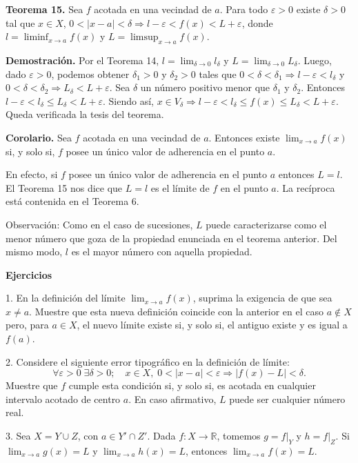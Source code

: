 \documentclass[12pt,oneside]{book}
\begin{document}
\textbf{Teorema 15.} Sea \(f\) acotada en una vecindad de \(a\). Para todo \(\varepsilon > 0\) existe \(\delta > 0\) tal que \(x \in X\), \(0 < |x - a| < \delta \Rightarrow l - \varepsilon < f(x) < L + \varepsilon\), donde \(l = \liminf_{x \to a} f(x)\) y \(L = \limsup_{x \to a} f(x)\).

\textbf{Demostración.} Por el Teorema 14, \(l = \lim_{\delta \to 0} l_\delta\) y \(L = \lim_{\delta \to 0} L_\delta\). Luego, dado \(\varepsilon > 0\), podemos obtener \(\delta_1 > 0\) y \(\delta_2 > 0\) tales que \(0 < \delta < \delta_1 \Rightarrow l - \varepsilon < l_\delta\) y \(0 < \delta < \delta_2 \Rightarrow L_\delta < L + \varepsilon\). Sea \(\delta\) un número positivo menor que \(\delta_1\) y \(\delta_2\). Entonces \(l - \varepsilon < l_\delta \leq L_\delta < L + \varepsilon\). Siendo así, \(x \in V_\delta \Rightarrow l - \varepsilon < l_\delta \leq f(x) \leq L_\delta < L + \varepsilon\). Queda verificada la tesis del teorema.

\textbf{Corolario.} Sea \(f\) acotada en una vecindad de \(a\). Entonces existe \(\lim_{x \to a} f(x)\) si, y solo si, \(f\) posee un único valor de adherencia en el punto \(a\).

En efecto, si \(f\) posee un único valor de adherencia en el punto \(a\) entonces \(L = l\). El Teorema 15 nos dice que \(L = l\) es el límite de \(f\) en el punto \(a\). La recíproca está contenida en el Teorema 6.

Observación: Como en el caso de sucesiones, \(L\) puede caracterizarse como el menor número que goza de la propiedad enunciada en el teorema anterior. Del mismo modo, \(l\) es el mayor número con aquella propiedad.

\textbf{Ejercicios}

1. En la definición del límite \(\lim_{x \to a} f(x)\), suprima la exigencia de que sea \(x \neq a\). Muestre que esta nueva definición coincide con la anterior en el caso \(a \notin X\) pero, para \(a \in X\), el nuevo límite existe si, y solo si, el antiguo existe y es igual a \(f(a)\).

2. Considere el siguiente error tipográfico en la definición de límite:
\[
\forall \varepsilon > 0 \; \exists \delta > 0; \quad x \in X, \; 0 < |x - a| < \varepsilon \Rightarrow |f(x) - L| < \delta.
\]
Muestre que \( f \) cumple esta condición si, y solo si, es acotada en cualquier intervalo acotado de centro \( a \). En caso afirmativo, \( L \) puede ser cualquier número real.

3. Sea \( X = Y \cup Z \), con \( a \in Y' \cap Z' \). Dada \( f: X \to \mathbb{R} \), tomemos \( g = f|_Y \) y \( h = f|_Z \). Si \( \lim_{x \to a} g(x) = L \) y \( \lim_{x \to a} h(x) = L \), entonces \( \lim_{x \to a} f(x) = L \).
\end{document}
